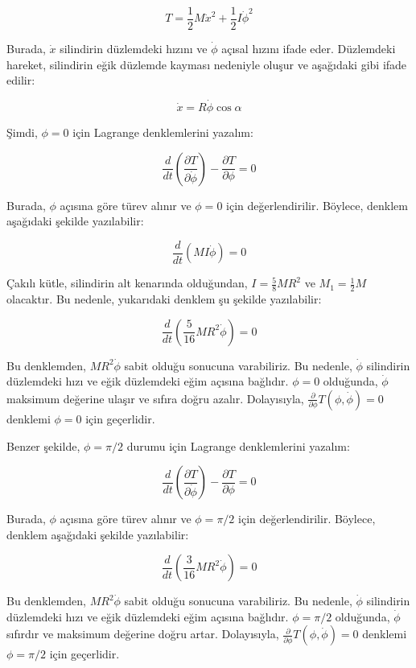 \documentclass[12pt]{article}
\begin{document}
$$T = \frac{1}{2}M\dot{x}^2 + \frac{1}{2}I\dot{\phi}^2$$

Burada, $\dot{x}$ silindirin düzlemdeki hızını ve $\dot{\phi}$ açısal hızını ifade eder. Düzlemdeki hareket, silindirin eğik düzlemde kayması nedeniyle oluşur ve aşağıdaki gibi ifade edilir:

$$\dot{x} = R\dot{\phi} \cos \alpha$$

Şimdi, $\phi = 0$ için Lagrange denklemlerini yazalım:

$$\frac{d}{dt} \left( \frac{\partial T}{\partial \dot{\phi}} \right) - \frac{\partial T}{\partial \phi} = 0 $$

Burada, $\phi$ açısına göre türev alınır ve $\phi=0$ için değerlendirilir. Böylece, denklem aşağıdaki şekilde yazılabilir:

$$\frac{d}{dt} \left( MI\dot{\phi} \right) = 0 $$

Çakılı kütle, silindirin alt kenarında olduğundan, $I = \frac{5}{8}MR^2$ ve $M_1 = \frac{1}{2}M$ olacaktır. Bu nedenle, yukarıdaki denklem şu şekilde yazılabilir:

$$\frac{d}{dt} \left( \frac{5}{16}MR^2 \dot{\phi} \right) = 0 $$

Bu denklemden, $MR^2 \dot{\phi}$ sabit olduğu sonucuna varabiliriz. Bu nedenle, $\dot{\phi}$ silindirin düzlemdeki hızı ve eğik düzlemdeki eğim açısına bağlıdır. $\phi=0$ olduğunda, $\dot{\phi}$ maksimum değerine ulaşır ve sıfıra doğru azalır. Dolayısıyla, $\frac{\partial}{\partial\phi}T(\phi,\dot{\phi})=0$ denklemi $\phi=0$ için geçerlidir.

Benzer şekilde, $\phi = \pi/2$ durumu için Lagrange denklemlerini yazalım:

$$\frac{d}{dt} \left( \frac{\partial T}{\partial \dot{\phi}} \right) - \frac{\partial T}{\partial \phi} = 0 $$

Burada, $\phi$ açısına göre türev alınır ve $\phi=\pi/2$ için değerlendirilir. Böylece, denklem aşağıdaki şekilde yazılabilir:

$$\frac{d}{dt} \left( \frac{3}{16}MR^2 \dot{\phi} \right) = 0 $$

Bu denklemden, $MR^2 \dot{\phi}$ sabit olduğu sonucuna varabiliriz. Bu nedenle, $\dot{\phi}$ silindirin düzlemdeki hızı ve eğik düzlemdeki eğim açısına bağlıdır. $\phi=\pi/2$ olduğunda, $\dot{\phi}$ sıfırdır ve maksimum değerine doğru artar. Dolayısıyla, $\frac{\partial}{\partial\phi}T(\phi,\dot{\phi})=0$ denklemi $\phi=\pi/2$ için geçerlidir.


\newpage
\end{document}
